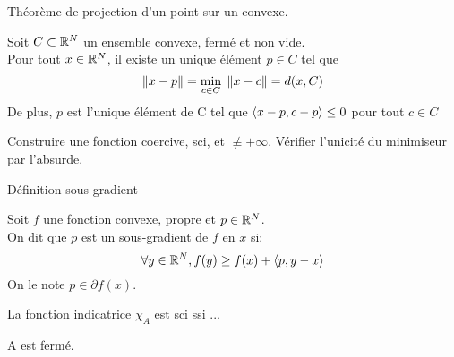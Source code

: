 \begin{note}
  \begin{field}
    Théorème de projection d'un point sur un convexe.
  \end{field}
  \begin{field}
    Soit $C \subset \mathbb{R}^N$ un ensemble convexe, fermé et non vide.\\
    Pour tout $x \in \mathbb{R}^N$, il existe un unique élément $p \in C$ tel
    que $$\left\lVert x-p\right\rVert = \underset{c \in C}{\min}\;\left\lVert x-c\right\rVert = d(x,C)$$
    De plus, $p$ est l'unique élément de C tel que $\langle x-p,c-p\rangle
    \leq 0$ pour tout $c \in C$
  \end{field}
  \begin{field}
    Construire une fonction coercive, sci, et $\not\equiv +\infty$.
    Vérifier l'unicité du minimiseur par l'absurde.
  \end{field}
\end{note}

\begin{note}
  \begin{field}
    Définition sous-gradient
  \end{field}
  \begin{field}
    Soit $f$ une fonction convexe, propre et $p \in \mathbb{R}^N$.\\
    On dit que $p$ est un sous-gradient de $f$ en $x$ si:
    $$\forall y \in \mathbb{R}^N, f(y) \geq f(x) + \langle p,y-x\rangle$$
    On le note $p \in \partial{f}(x)$.
  \end{field}
  \begin{field}

  \end{field}
\end{note}

\begin{note}
  \begin{field}
    La fonction indicatrice $\chi_A$ est sci ssi ...
  \end{field}
  \begin{field}
    A est fermé.
  \end{field}
  \begin{field}

  \end{field}
\end{note}

